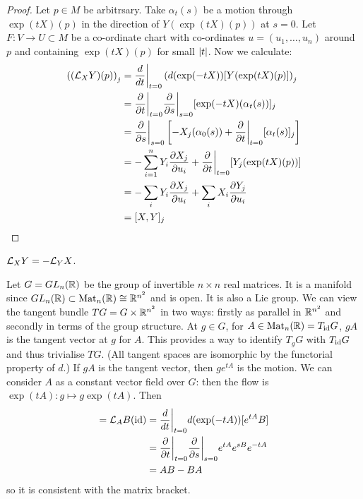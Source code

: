 \begin{proof}
  Let $p \in M$ be arbitrsary.
  Take $\alpha_t(s)$ be a motion through $\exp(tX)(p)$ in the direction of $Y(\exp(tX)(p))$ at $s=0$.
  Let $F: V \to U \subset M$ be a co-ordinate chart with co-ordinates $u=(u_1,\ldots,u_n)$ around $p$ and containing $\exp(tX)(p)$ for small $\left\lvert t \right\rvert$.
  Now we calculate:
  \begin{align*}
  \left( (\mathcal{L}_XY)(p) \right)_j &= \frac{d}{dt} \bigg\vert_{t=0} \left( d(\exp(-tX)) [Y(\exp(tX)(p)] \right)_j \\
    &= \frac{\partial}{\partial t} \bigg\vert_{t=0} \frac{\partial}{\partial s} \bigg\vert_{s=0} [\exp(-tX)(\alpha_t(s))]_j \\
    &= \frac{\partial}{\partial s}\bigg\vert_{s=0} \left[ -X_j(\alpha_0(s)) + \frac{\partial}{\partial t}\bigg\vert_{t=0}[\alpha_t(s)]_j \right] \\
    &= -\sum_{i=1}^n Y_i \frac{\partial X_j}{\partial u_i} + \frac{\partial}{\partial t}\bigg\vert_{t=0} [Y_j(\exp(tX)(p))] \\
    &= -\sum_i Y_i \frac{\partial X_j}{\partial u_i} + \sum_i X_i \frac{\partial Y_j}{\partial u_i} \\
    &= [X,Y]_j \qedhere
  \end{align*}
\end{proof}

\begin{cor}
  $\mathcal{L}_XY=-\mathcal{L}_YX$.
\end{cor}

\begin{exam}[2.21]
  Let $G=GL_n(\mathbb{R})$ be the group of invertible $n\times n$ real matrices.
  It is a manifold since $GL_n(\mathbb{R})\subset\operatorname{Mat}_n(\mathbb{R})\cong\mathbb{R}^{n^2}$ and is open.
  It is also a Lie group.
  We can view the tangent bundle $TG=G\times\mathbb{R}^{n^2}$ in two ways: firstly as parallel in $\mathbb{R}^{n^2}$ and secondly in terms of the group structure.
  At $g\in G$, for $A\in\operatorname{Mat}_n(\mathbb{R})=T_{\operatorname{id}} G$, $gA$ is the tangent vector at $g$ for $A$.
  This provides a way to identify $T_gG$ with $T_{\operatorname{id}}G$ and thus trivialise $TG$.
  (All tangent spaces are isomorphic by the functorial property of $d$.)
  If $gA$ is the tangent vector, then $ge^{tA}$ is the motion.
  We can consider $A$ as a constant vector field over $G$: then the flow is $\exp(tA): g \mapsto g\exp(tA)$.
  Then
  \begin{align*}
    [A,B] = \cL_AB(\id) &= \frac{d}{dt}\bigg\vert_{t=0} d(\exp(-tA))[e^{tA}B] \\
    &= \frac{\p}{\p t}\bigg\vert_{t=0} \frac{\p}{\p s}\bigg\vert_{s=0} e^{tA}e^{sB}e^{-tA} \\
    &= AB-BA
  \end{align*}
  so it is consistent with the matrix bracket.
\end{exam}
